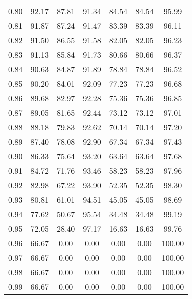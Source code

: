 \begin{tabular}{|c|c|c|c|c|c|c|}
      0.80 &     92.17 &     87.81 &      91.34 &   84.54 &      84.54 &         95.99 \\
      0.81 &     91.87 &     87.24 &      91.47 &   83.39 &      83.39 &         96.11 \\
      0.82 &     91.50 &     86.55 &      91.58 &   82.05 &      82.05 &         96.23 \\
      0.83 &     91.13 &     85.84 &      91.73 &   80.66 &      80.66 &         96.37 \\
      0.84 &     90.63 &     84.87 &      91.89 &   78.84 &      78.84 &         96.52 \\
      0.85 &     90.20 &     84.01 &      92.09 &   77.23 &      77.23 &         96.68 \\
      0.86 &     89.68 &     82.97 &      92.28 &   75.36 &      75.36 &         96.85 \\
      0.87 &     89.05 &     81.65 &      92.44 &   73.12 &      73.12 &         97.01 \\
      0.88 &     88.18 &     79.83 &      92.62 &   70.14 &      70.14 &         97.20 \\
      0.89 &     87.40 &     78.08 &      92.90 &   67.34 &      67.34 &         97.43 \\
      0.90 &     86.33 &     75.64 &      93.20 &   63.64 &      63.64 &         97.68 \\
      0.91 &     84.72 &     71.76 &      93.46 &   58.23 &      58.23 &         97.96 \\
      0.92 &     82.98 &     67.22 &      93.90 &   52.35 &      52.35 &         98.30 \\
      0.93 &     80.81 &     61.01 &      94.51 &   45.05 &      45.05 &         98.69 \\
      0.94 &     77.62 &     50.67 &      95.54 &   34.48 &      34.48 &         99.19 \\
      0.95 &     72.05 &     28.40 &      97.17 &   16.63 &      16.63 &         99.76 \\
      0.96 &     66.67 &      0.00 &       0.00 &    0.00 &       0.00 &        100.00 \\
      0.97 &     66.67 &      0.00 &       0.00 &    0.00 &       0.00 &        100.00 \\
      0.98 &     66.67 &      0.00 &       0.00 &    0.00 &       0.00 &        100.00 \\
      0.99 &     66.67 &      0.00 &       0.00 &    0.00 &       0.00 &        100.00 \\
\bottomrule
\end{tabular}
